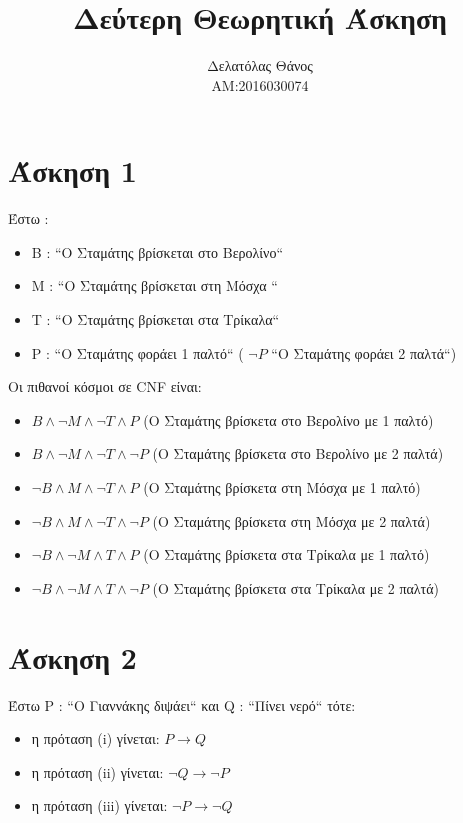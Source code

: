 \documentclass[12pt]{article}
\begin{document}
	
	
	\greektext
	
	\title{ \textbf{Δεύτερη Θεωρητική Άσκηση}}
	\author{Δελατόλας Θάνος \\ AM:2016030074}
	\date{}
	
	
	\maketitle
	\newpage
	\section*{ Άσκηση 1}
	Έστω :
	\begin{itemize}
		\item \textlatin{B} : ``Ο Σταμάτης βρίσκεται στο Βερολίνο``
		\item \textlatin{M} : ``Ο Σταμάτης βρίσκεται στη Μόσχα ``
		\item \textlatin{T} : ``Ο Σταμάτης βρίσκεται στα Τρίκαλα``
		\item \textlatin{P} : ``Ο Σταμάτης φοράει 1 παλτό`` ( $\neg P$ ``Ο Σταμάτης φοράει 2 παλτά``)
	\end{itemize}
		
	\noindent
	Οι πιθανοί κόσμοι σε \textlatin{CNF} είναι:
	\begin{itemize}
		\item  $Β \wedge \neg M \wedge \neg T \wedge P$ (Ο Σταμάτης βρίσκετα στο Βερολίνο με 1 παλτό)
		\item  $Β \wedge \neg M \wedge \neg T \wedge \neg P$ (Ο Σταμάτης βρίσκετα στο Βερολίνο με 2 παλτά)
		\item  $\neg Β \wedge M \wedge \neg T \wedge P$ (Ο Σταμάτης βρίσκετα στη Μόσχα με 1 παλτό)
		\item  $\neg Β \wedge M \wedge \neg T \wedge \neg P$ (Ο Σταμάτης βρίσκετα στη Μόσχα με 2 παλτά)
		\item  $\neg Β \wedge \neg M \wedge  T \wedge P$ (Ο Σταμάτης βρίσκετα στα Τρίκαλα με 1 παλτό)
		\item  $\neg Β \wedge \neg M \wedge  T \wedge \neg P$ (Ο Σταμάτης βρίσκετα στα Τρίκαλα με 2 παλτά)
	\end{itemize}
	
	\section*{ Άσκηση 2}
	Έστω \textlatin{P} : ``Ο Γιαννάκης διψάει`` και \textlatin{Q} : ``Πίνει νερό`` τότε:
	\begin{itemize}
		\item η  πρόταση \textlatin{(i)} γίνεται: $P \rightarrow Q$
		\item η  πρόταση \textlatin{(ii)} γίνεται: $\neg Q \rightarrow \neg P$
		\item η  πρόταση \textlatin{(iii)} γίνεται: $\neg P \rightarrow \neg Q$
	\end{itemize}
	
\end{document}

